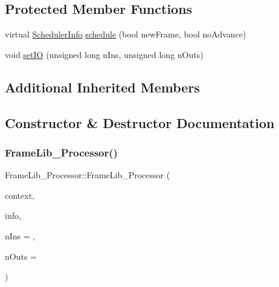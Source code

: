 \subsection*{Protected Member Functions}
\begin{DoxyCompactItemize}
\item 
virtual \hyperlink{struct_frame_lib___d_s_p_1_1_scheduler_info}{Scheduler\+Info} \hyperlink{class_frame_lib___processor_a2487e6433f6a5e79014664a0500ccc24}{schedule} (bool new\+Frame, bool no\+Advance)
\item 
void \hyperlink{class_frame_lib___processor_a84035040e5e1cff07e16502ee290881e}{set\+IO} (unsigned long n\+Ins, unsigned long n\+Outs)
\end{DoxyCompactItemize}
\subsection*{Additional Inherited Members}


\subsection{Constructor \& Destructor Documentation}
\mbox{\label{class_frame_lib___processor_aaa48ccb4d8b92b2d51408499e2d52e8c}} 
\subsubsection{\texorpdfstring{Frame\+Lib\+\_\+\+Processor()}{FrameLib\_Processor()}}
{\footnotesize\ttfamily Frame\+Lib\+\_\+\+Processor\+::\+Frame\+Lib\+\_\+\+Processor (\begin{DoxyParamCaption}\item[{\hyperlink{class_frame_lib___context}{Frame\+Lib\+\_\+\+Context}}]{context,  }\item[{\hyperlink{class_frame_lib___parameters_1_1_info}{Frame\+Lib\+\_\+\+Parameters\+::\+Info} $\ast$}]{info,  }\item[{unsigned long}]{n\+Ins = {},  }\item[{unsigned long}]{n\+Outs = {} }\end{DoxyParamCaption})\hspace{0.3cm}{\ttfamily [inline]}}



